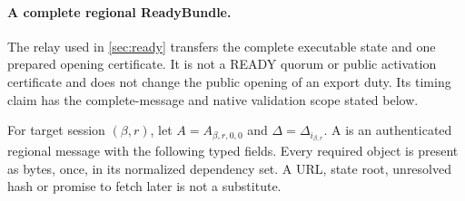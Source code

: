 \paragraph{A complete regional ReadyBundle.}
\label{sec:ready-bundle}
The relay used in \cref{sec:ready} transfers the complete executable
state and one prepared opening certificate. It is not a READY quorum
or public activation certificate and does not change the public opening
of an export duty. Its timing claim has the complete-message and native
validation scope stated below.

For target session $(\beta,r)$, let $A=A_{\beta,r,0,0}$ and
$\Delta=\Delta_{i_{\beta,r}}$. A  is an authenticated
regional message with the following typed fields. Every required object
is present as bytes, once, in its normalized dependency set. A URL,
state root, unresolved hash or promise to fetch later is not a substitute.
